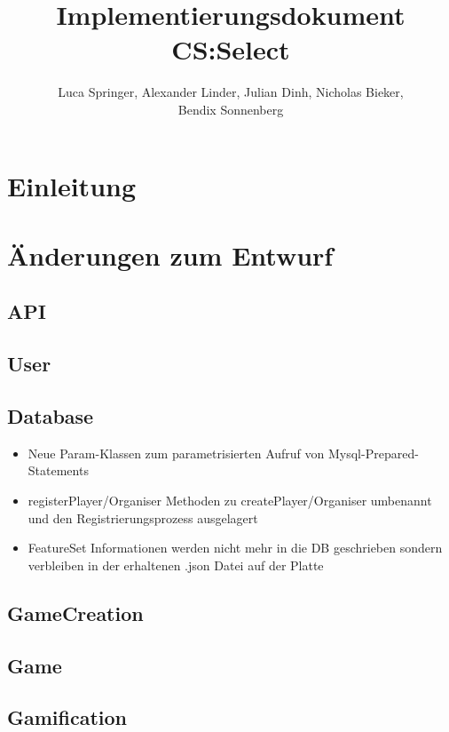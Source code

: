\documentclass[a4paper]{scrreprt}
\begin{document}
\title{Implementierungsdokument CS:Select}
\author{Luca Springer, Alexander Linder, Julian Dinh, Nicholas Bieker,\\ Bendix Sonnenberg}
\maketitle

\tableofcontents


\chapter{Einleitung}

\chapter{Änderungen zum Entwurf}

\section{API}

\section{User}

\section{Database}
\begin{itemize}
    \item Neue Param-Klassen zum parametrisierten Aufruf von Mysql-Prepared-Statements
    \item registerPlayer/Organiser Methoden zu createPlayer/Organiser umbenannt und den Registrierungsprozess ausgelagert
    \item FeatureSet Informationen werden nicht mehr in die DB geschrieben sondern verbleiben in der erhaltenen .json Datei auf der Platte
\end{itemize}

\section{GameCreation}

\section{Game}

\section{Gamification}
\end{document}
